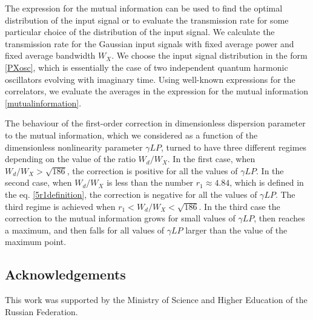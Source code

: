 \documentclass{article}
\begin{document}
The expression for the mutual information can be used to find the optimal distribution of the input signal or to evaluate the transmission rate for some particular choice of the distribution of the input signal. We calculate the transmission rate for the Gaussian input signals with fixed average power and fixed average bandwidth $W_{X}$. We choose the input signal distribution in the form \eqref{PXosc}, which is essentially the case of two independent quantum harmonic oscillators evolving with imaginary time. Using well-known expressions for the correlators, we evaluate the averages in the expression for the mutual information \eqref{mutualinformation}. 

The behaviour of the first-order correction in dimensionless dispersion parameter to the mutual information, which we considered as a function of the dimensionless nonlinearity parameter $\gamma LP$, turned to have three different regimes depending on the value of the ratio $W_{d}/W_{X}$. In the first case, when $W_{d}/W_{X} > \sqrt{186}$, the correction is positive for all the values of $\gamma LP$. In the second case, when $W_{d}/W_{X}$ is less than the number $r_{1} \approx 4.84$, which is defined in the eq. \eqref{5r1definition}, the correction is negative for all the values of $\gamma LP$. The third regime is achieved when $r_{1} < W_{d}/W_{X} < \sqrt{186}$. In the third case the correction to the mutual information grows for small values of $\gamma LP$, then reaches a maximum, and then falls for all values of $\gamma LP$ larger than the value of the maximum point. 

\subsection*{Acknowledgements}
This work was supported by the Ministry of Science and Higher Education of the Russian Federation.
\end{document}
